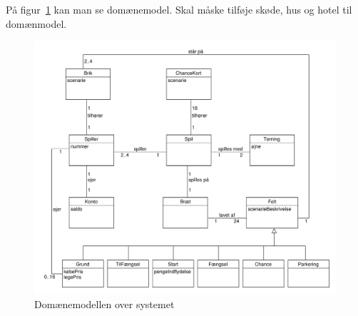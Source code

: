 \documentclass[class=article, crop=false]{standalone}
\begin{document}
    På figur~\ref{fig:domain_model} kan man se domænemodel. Skal måske tilføje skøde, hus og hotel til domænmodel.

            \begin{figure}[H]
                \centering

                \includegraphics[scale=0.3]{diagrams_png/domain_model.pdf}
                \caption{Domænemodellen over systemet}\label{fig:domain_model}
            \end{figure}
\end{document}
